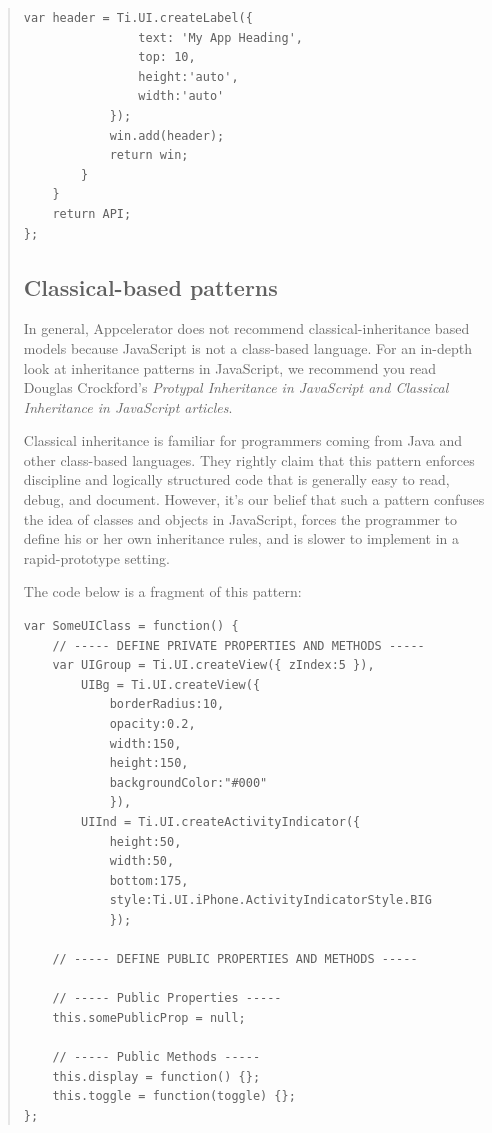 \documentclass[11pt]{book}
\begin{document}
\begin{quotation}
\begin{lstlisting}[frame=single]
            var header = Ti.UI.createLabel({
                text: 'My App Heading',
                top: 10,
                height:'auto',
                width:'auto'
            });
            win.add(header);
            return win;
        }
    }
    return API;
};
\end{lstlisting}

\subsection{Classical-based patterns}
In general, Appcelerator does not recommend classical-inheritance based models because JavaScript is not a class-based language. For an in-depth look at inheritance patterns in JavaScript, we recommend you read Douglas Crockford's \emph{Protypal Inheritance in JavaScript and Classical Inheritance in JavaScript articles}.


Classical inheritance is familiar for programmers coming from Java and other class-based languages. They rightly claim that this pattern enforces discipline and logically structured code that is generally easy to read, debug, and document. However, it's our belief that such a pattern confuses the idea of classes and objects in JavaScript, forces the programmer to define his or her own inheritance rules, and is slower to implement in a rapid-prototype setting.

The code below is a fragment of this pattern:
\begin{lstlisting}[frame=single]
var SomeUIClass = function() {
    // ----- DEFINE PRIVATE PROPERTIES AND METHODS -----
    var UIGroup = Ti.UI.createView({ zIndex:5 }),
        UIBg = Ti.UI.createView({
            borderRadius:10,
            opacity:0.2,
            width:150,
            height:150,
            backgroundColor:"#000" 
            }),
        UIInd = Ti.UI.createActivityIndicator({
            height:50,
            width:50,
            bottom:175,
            style:Ti.UI.iPhone.ActivityIndicatorStyle.BIG
            });

    // ----- DEFINE PUBLIC PROPERTIES AND METHODS -----

    // ----- Public Properties -----
    this.somePublicProp = null;

    // ----- Public Methods -----
    this.display = function() {};
    this.toggle = function(toggle) {};
};
\end{lstlisting}
\end{quotation}
\end{document}

